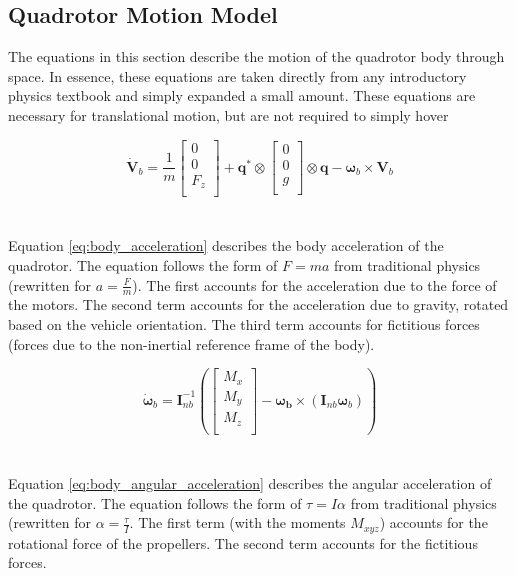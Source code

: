 \documentclass{article}
\numberwithin{equation}{section} %
\begin{document}
\subsection{Quadrotor Motion Model}
The equations in this section describe the motion of the quadrotor body through space. In essence, these equations are taken directly from any introductory physics textbook and simply expanded a small amount. These equations are necessary for translational motion, but are not required to simply hover

\begin{equation} \label{eq:body_acceleration}
\dot{\boldsymbol{V}}_b = \frac{1}{m} 
	\left[
		\begin{array}{c}
			0 \\
			0 \\
			F_z \\
		\end{array}
	\right]
	+ \boldsymbol{q}^* \otimes
		\left[
			\begin{array}{c}
				0 \\
				0 \\
				g \\
			\end{array}
		\right]
	\otimes \boldsymbol{q} - \boldsymbol{\omega}_b \times \boldsymbol{V}_b
\end{equation}
\\ \\
Equation \eqref{eq:body_acceleration} describes the body acceleration of the quadrotor. The equation follows the form of $F = ma$ from traditional physics (rewritten for $a = \frac{F}{m}$). The first accounts for the acceleration due to the force of the motors. The second term accounts for the acceleration due to gravity, rotated based on the vehicle orientation. The third term accounts for fictitious forces (forces due to the non-inertial reference frame of the body).

\begin{equation} \label{eq:body_angular_acceleration}
\dot{\boldsymbol{\omega}}_b = \boldsymbol{I}^{-1}_{nb}
	\left(
		\left[
			\begin{array}{c}
				M_x \\
				M_y \\
				M_z \\
			\end{array}
		\right]
		- \boldsymbol{\omega_b} \times \left( \boldsymbol{I}_{nb} \boldsymbol{\omega}_b \right)
	\right)
\end{equation}
\\ \\
Equation \eqref{eq:body_angular_acceleration} describes the angular acceleration of the quadrotor. The equation follows the form of $\tau = I \alpha$ from traditional physics (rewritten for $\alpha = \frac{\tau}{I}$. The first term (with the moments $M_{xyz}$) accounts for the rotational force of the propellers. The second term accounts for the fictitious forces.
\end{document}
